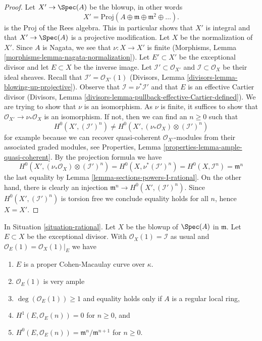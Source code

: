 \begin{proof}
Let $X' \to \Spec(A)$ be the blowup, in other words
$$
X' = \text{Proj}(A \oplus \mathfrak m \oplus \mathfrak m^2 \oplus \ldots).
$$
is the Proj of the Rees algebra. This in particular shows that
$X'$ is integral and that $X' \to \Spec(A)$ is a projective
modification. Let $X$ be the normalization of $X'$.
Since $A$ is Nagata, we see that $\nu : X \to X'$ is finite
(Morphisms, Lemma \ref{morphisms-lemma-nagata-normalization}).
Let $E' \subset X'$ be the exceptional divisor and let $E \subset X$
be the inverse image. Let $\mathcal{I}' \subset \mathcal{O}_{X'}$
and $\mathcal{I} \subset \mathcal{O}_X$ be their ideal sheaves.
Recall that $\mathcal{I}' = \mathcal{O}_{X'}(1)$
(Divisors, Lemma \ref{divisors-lemma-blowing-up-projective}).
Observe that $\mathcal{I} = \nu^*\mathcal{I}'$ and that $E$ is an
effective Cartier divisor (Divisors, Lemma
\ref{divisors-lemma-pullback-effective-Cartier-defined}).
We are trying to show that $\nu$ is an isomorphism. As $\nu$ is finite,
it suffices to show that $\mathcal{O}_{X'} \to \nu_*\mathcal{O}_X$
is an isomorphism. If not, then we can find an $n \geq 0$ such that
$$
H^0(X', (\mathcal{I}')^n) \not =
H^0(X', (\nu_*\mathcal{O}_X) \otimes (\mathcal{I}')^n)
$$
for example because we can recover quasi-coherent $\mathcal{O}_{X'}$-modules
from their associated graded modules, see
Properties, Lemma \ref{properties-lemma-ample-quasi-coherent}.
By the projection formula we have
$$
H^0(X', (\nu_*\mathcal{O}_X) \otimes (\mathcal{I}')^n) =
H^0(X, \nu^*(\mathcal{I}')^n) =
H^0(X, \mathcal{I}^n) = \mathfrak m^n
$$
the last equality by Lemma \ref{lemma-sections-powers-I-rational}.
On the other hand, there is clearly an injection
$\mathfrak m^n \to H^0(X', (\mathcal{I}')^n)$. Since
$H^0(X', (\mathcal{I}')^n)$ is torsion free we conclude equality holds
for all $n$, hence $X = X'$.
\end{proof}

\begin{lemma}
\label{lemma-cohomology-blow-up-rational}
In Situation \ref{situation-rational}.
Let $X$ be the blowup of $\Spec(A)$ in $\mathfrak m$. Let $E \subset X$
be the exceptional divisor. With $\mathcal{O}_X(1) = \mathcal{I}$ as
usual and $\mathcal{O}_E(1) = \mathcal{O}_X(1)|_E$ we have
\begin{enumerate}
\item $E$ is a proper Cohen-Macaulay curve over $\kappa$.
\item $\mathcal{O}_E(1)$ is very ample
\item $\deg(\mathcal{O}_E(1)) \geq 1$ and equality holds only if
$A$ is a regular local ring,
\item $H^1(E, \mathcal{O}_E(n)) = 0$ for $n \geq 0$, and
\item $H^0(E, \mathcal{O}_E(n)) = \mathfrak m^n/\mathfrak m^{n + 1}$
for $n \geq 0$.
\end{enumerate}
\end{lemma}

